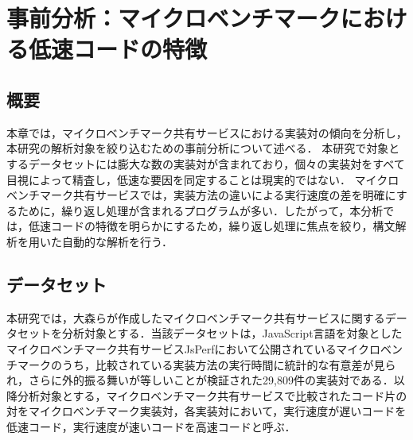 \documentclass[11pt]{jreport}
\begin{document}
\chapter{事前分析：マイクロベンチマークにおける低速コードの特徴}
\label{chap:pre-analysis}


\section{概要}
\label{preanalysis_abst}


本章では，マイクロベンチマーク共有サービスにおける実装対の傾向を分析し，本研究の解析対象を絞り込むための事前分析について述べる．
本研究で対象とするデータセットには膨大な数の実装対が含まれており，個々の実装対をすべて目視によって精査し，低速な要因を同定することは現実的ではない．
マイクロベンチマーク共有サービスでは，実装方法の違いによる実行速度の差を明確にするために，繰り返し処理が含まれるプログラムが多い．したがって，本分析では，低速コードの特徴を明らかにするため，繰り返し処理に焦点を絞り，構文解析を用いた自動的な解析を行う．


\section{データセット}

本研究では，大森ら\cite{omori}が作成したマイクロベンチマーク共有サービスに関するデータセットを分析対象とする．当該データセットは，JavaScript言語を対象としたマイクロベンチマーク共有サービスJsPerfにおいて公開されているマイクロベンチマークのうち，比較されている実装方法の実行時間に統計的な有意差が見られ，さらに外的振る舞いが等しいことが検証された29,809件の実装対である．以降分析対象とする，マイクロベンチマーク共有サービスで比較されたコード片の対をマイクロベンチマーク実装対，各実装対において，実行速度が遅いコードを低速コード，実行速度が速いコードを高速コードと呼ぶ．
\end{document}
